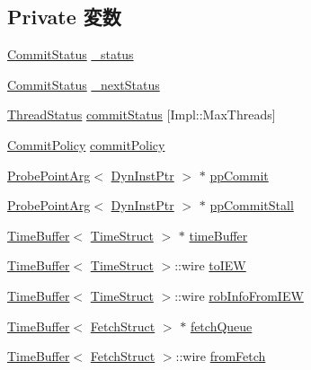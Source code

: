 \subsection*{Private 変数}
\begin{DoxyCompactItemize}
\item 
\hyperlink{classDefaultCommit_a40bce497731b29d1d0756af6c5e40986}{CommitStatus} \hyperlink{classDefaultCommit_a0cf11ec4d376480eb733b779911f6446}{\_\-status}
\item 
\hyperlink{classDefaultCommit_a40bce497731b29d1d0756af6c5e40986}{CommitStatus} \hyperlink{classDefaultCommit_a96c6cf126a60fa550bd3e279b0f33838}{\_\-nextStatus}
\item 
\hyperlink{classDefaultCommit_ae2739961013a00cede621d4d72f2173c}{ThreadStatus} \hyperlink{classDefaultCommit_ae7adb1afa143087a1e39aa65f3921185}{commitStatus} \mbox{[}Impl::MaxThreads\mbox{]}
\item 
\hyperlink{classDefaultCommit_a2b5cad948a22cc08e48fe1a2226c8d05}{CommitPolicy} \hyperlink{classDefaultCommit_acbc18713699043ca78415e9f03712ce1}{commitPolicy}
\item 
\hyperlink{classProbePointArg}{ProbePointArg}$<$ \hyperlink{classDefaultCommit_a028ce10889c5f6450239d9e9a7347976}{DynInstPtr} $>$ $\ast$ \hyperlink{classDefaultCommit_ae41ff03242cc6980c072e3ea824168ed}{ppCommit}
\item 
\hyperlink{classProbePointArg}{ProbePointArg}$<$ \hyperlink{classDefaultCommit_a028ce10889c5f6450239d9e9a7347976}{DynInstPtr} $>$ $\ast$ \hyperlink{classDefaultCommit_a3c0bfd67f137dbd48bc31ade04a09cf0}{ppCommitStall}
\item 
\hyperlink{classTimeBuffer}{TimeBuffer}$<$ \hyperlink{structTimeStruct}{TimeStruct} $>$ $\ast$ \hyperlink{classDefaultCommit_a83f9ee976e732665aeb08dbc19acfd45}{timeBuffer}
\item 
\hyperlink{classTimeBuffer}{TimeBuffer}$<$ \hyperlink{structTimeStruct}{TimeStruct} $>$::wire \hyperlink{classDefaultCommit_a2877bfe6e25eb731f28c8c5a9ba55391}{toIEW}
\item 
\hyperlink{classTimeBuffer}{TimeBuffer}$<$ \hyperlink{structTimeStruct}{TimeStruct} $>$::wire \hyperlink{classDefaultCommit_a2b90705fefdf84763685650c2420f184}{robInfoFromIEW}
\item 
\hyperlink{classTimeBuffer}{TimeBuffer}$<$ \hyperlink{classDefaultCommit_a3aac8607069f16898ef53cfaa2d97aeb}{FetchStruct} $>$ $\ast$ \hyperlink{classDefaultCommit_a9a2f350be647ebfb6567172812db491a}{fetchQueue}
\item 
\hyperlink{classTimeBuffer}{TimeBuffer}$<$ \hyperlink{classDefaultCommit_a3aac8607069f16898ef53cfaa2d97aeb}{FetchStruct} $>$::wire \hyperlink{classDefaultCommit_a2e3dd009c447d077f19b303b53b52fab}{fromFetch}

\end{DoxyCompactItemize}
